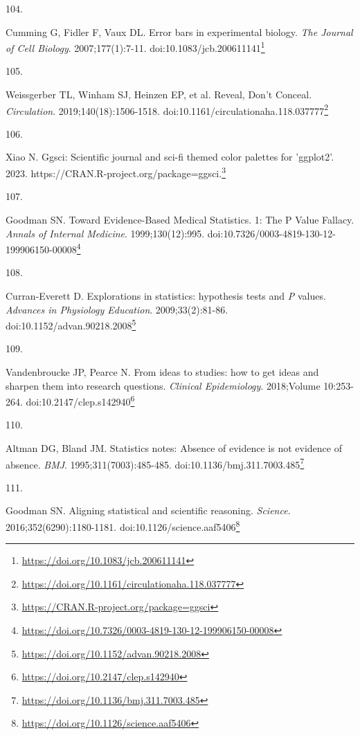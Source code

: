 \documentclass[
  a4paper,
]{book}
\newlength{\cslhangindent}
\newlength{\csllabelwidth}
\newlength{\cslentryspacingunit} %
\newenvironment{CSLReferences}[2] %
 {%
  \setlength{\parindent}{0pt}
  \ifodd #1
  \let\oldpar\par
  \def\par{\hangindent=\cslhangindent\oldpar}
  \fi
  \setlength{\parskip}{#2\cslentryspacingunit}
 }%
 {}
\newcommand{\CSLLeftMargin}[1]{\parbox[t]{\csllabelwidth}{#1}}
\newcommand{\CSLRightInline}[1]{\parbox[t]{\linewidth - \csllabelwidth}{#1}\break}
\renewcommand{\href}[2]{#2\footnote{\url{#1}}}
\begin{document}
\begin{CSLReferences}{0}{0}
\leavevmode{}%
\CSLLeftMargin{104. }%
\CSLRightInline{Cumming G, Fidler F, Vaux DL. Error bars in experimental biology. \emph{The Journal of Cell Biology}. 2007;177(1):7-11. doi:\href{https://doi.org/10.1083/jcb.200611141}{10.1083/jcb.200611141}}

\leavevmode{}%
\CSLLeftMargin{105. }%
\CSLRightInline{Weissgerber TL, Winham SJ, Heinzen EP, et al. Reveal, Don{'}t Conceal. \emph{Circulation}. 2019;140(18):1506-1518. doi:\href{https://doi.org/10.1161/circulationaha.118.037777}{10.1161/circulationaha.118.037777}}

\leavevmode{}%
\CSLLeftMargin{106. }%
\CSLRightInline{Xiao N. Ggsci: Scientific journal and sci-fi themed color palettes for 'ggplot2'. 2023. \href{https://CRAN.R-project.org/package=ggsci}{https://CRAN.R-project.org/package=ggsci.}}

\leavevmode{}%
\CSLLeftMargin{107. }%
\CSLRightInline{Goodman SN. Toward Evidence-Based Medical Statistics. 1: The P Value Fallacy. \emph{Annals of Internal Medicine}. 1999;130(12):995. doi:\href{https://doi.org/10.7326/0003-4819-130-12-199906150-00008}{10.7326/0003-4819-130-12-199906150-00008}}

\leavevmode{}%
\CSLLeftMargin{108. }%
\CSLRightInline{Curran-Everett D. Explorations in statistics: hypothesis tests and {\emph{P}} values. \emph{Advances in Physiology Education}. 2009;33(2):81-86. doi:\href{https://doi.org/10.1152/advan.90218.2008}{10.1152/advan.90218.2008}}

\leavevmode{}%
\CSLLeftMargin{109. }%
\CSLRightInline{Vandenbroucke JP, Pearce N. From ideas to studies: how to get ideas and sharpen them into research questions. \emph{Clinical Epidemiology}. 2018;Volume 10:253-264. doi:\href{https://doi.org/10.2147/clep.s142940}{10.2147/clep.s142940}}

\leavevmode{}%
\CSLLeftMargin{110. }%
\CSLRightInline{Altman DG, Bland JM. Statistics notes: Absence of evidence is not evidence of absence. \emph{BMJ}. 1995;311(7003):485-485. doi:\href{https://doi.org/10.1136/bmj.311.7003.485}{10.1136/bmj.311.7003.485}}

\leavevmode{}%
\CSLLeftMargin{111. }%
\CSLRightInline{Goodman SN. Aligning statistical and scientific reasoning. \emph{Science}. 2016;352(6290):1180-1181. doi:\href{https://doi.org/10.1126/science.aaf5406}{10.1126/science.aaf5406}}


\end{CSLReferences}
\end{document}
